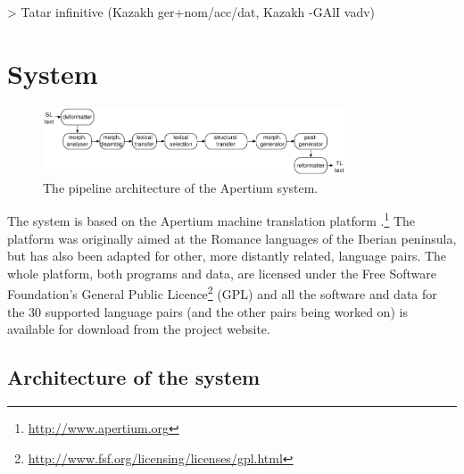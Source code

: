 \documentclass[11pt]{article}
\begin{document}
> Tatar infinitive (Kazakh ger+nom/acc/dat, Kazakh -GAlI vadv)
 
\section{System}
\label{sec:sys}

\begin{figure}[htbp]
\begin{center}
 \includegraphics[width=0.8\textwidth]{architecture.pdf}
\end{center}
\caption{The pipeline architecture of the Apertium system.}
\label{fig:modules}
\end{figure}

The system is based on the Apertium machine translation 
platform \citep{apertium/2011}.\footnote{\url{http://www.apertium.org}} The 
platform was originally aimed at the Romance languages of the Iberian peninsula, but has also been adapted for 
other, more distantly related, language pairs.
The whole platform, both programs and data, are licensed under the Free Software Foundation's General Public 
Licence\footnote{\url{http://www.fsf.org/licensing/licenses/gpl.html}} (GPL) and all the software and data for the 
30 supported language pairs (and the other pairs being worked on) is available for download from the project 
website.

\subsection{Architecture of the system}
\end{document}

